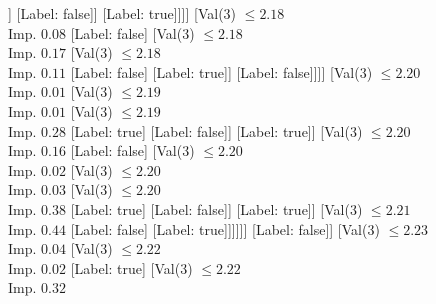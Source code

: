 \documentclass[margin=10pt]{standalone}
\begin{document}
\begin{forest}
																						[Label: true]
																						[Val($3$) $ \leq 2.16$ \\ Imp. $0.04$
																							[Label: true]
																							[Val($3$) $ \leq 2.17$ \\ Imp. $0.12$
																								[Val($3$) $ \leq 2.17$ \\ Imp. $0.11$
																									[Val($3$) $ \leq 2.17$ \\ Imp. $0.50$
																										[Label: false]
																										[Label: true]]
																									[Label: false]]
																								[Label: true]]]]
																					[Val($3$) $ \leq 2.18$ \\ Imp. $0.08$
																						[Label: false]
																						[Val($3$) $ \leq 2.18$ \\ Imp. $0.17$
																							[Val($3$) $ \leq 2.18$ \\ Imp. $0.11$
																								[Label: false]
																								[Label: true]]
																							[Label: false]]]]
																				[Val($3$) $ \leq 2.20$ \\ Imp. $0.01$
																					[Val($3$) $ \leq 2.19$ \\ Imp. $0.01$
																						[Val($3$) $ \leq 2.19$ \\ Imp. $0.28$
																							[Label: true]
																							[Label: false]]
																						[Label: true]]
																					[Val($3$) $ \leq 2.20$ \\ Imp. $0.16$
																						[Label: false]
																						[Val($3$) $ \leq 2.20$ \\ Imp. $0.02$
																							[Val($3$) $ \leq 2.20$ \\ Imp. $0.03$
																								[Val($3$) $ \leq 2.20$ \\ Imp. $0.38$
																									[Label: true]
																									[Label: false]]
																								[Label: true]]
																							[Val($3$) $ \leq 2.21$ \\ Imp. $0.44$
																								[Label: false]
																								[Label: true]]]]]]
																			[Label: false]]
																		[Val($3$) $ \leq 2.23$ \\ Imp. $0.04$
																			[Val($3$) $ \leq 2.22$ \\ Imp. $0.02$
																				[Label: true]
																				[Val($3$) $ \leq 2.22$ \\ Imp. $0.32$

\end{forest}
\end{document}

